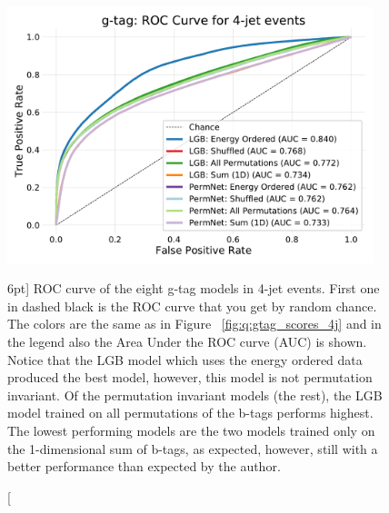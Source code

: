 \documentclass[a4paper, twoside, nobib]{tufte-book}
\newcommand{\figref}[1]{Figure ~\ref{#1}}
\begin{document}
\begin{figure}
  \includegraphics[width=0.95\textwidth, trim=10 10 10 40, clip]{figures/quarks/gtag_ROC_4_jet-down_sample=1.00-ML_vars=vertex-selection=b-ejet_min=4-n_iter_RS_lgb=99-n_iter_RS_xgb=9-cdot_cut=0.90-version=19.pdf}
  \caption[ROC curve for g-tag in 4-jet events][6pt]
          {ROC curve of the eight g-tag models in 4-jet events. First one in dashed black is the ROC curve that you get by random chance. The colors are the same as in \figref{fig:q:gtag_scores_4j} and in the legend also the Area Under the ROC curve (AUC) is shown. 
          Notice that the LGB model which uses the energy ordered data produced the best model, however, this model is not permutation invariant. Of the permutation invariant models (the rest), the LGB model trained on all permutations of the b-tags performs highest. The lowest performing models are the two models trained only on the 1-dimensional sum of b-tags, as expected, however, still with a better performance than expected by the author.  
          } 
  \label{fig:q:roc_gtag_4j}
\end{figure}
\end{document}
